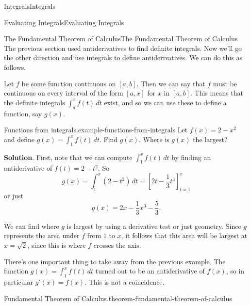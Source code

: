 \documentclass[10pt,]{book}
\numberwithin{equation}{section}
\begin{document}
\begin{chapterptx}{Integrals}{}{Integrals}{}{}
\begin{sectionptx}{Evaluating Integrals}{}{Evaluating Integrals}{}{}
\end{sectionptx}
%
%
\typeout{************************************************}
\typeout{************************************************}
%
\begin{sectionptx}{The Fundamental Theorem of Calculus}{}{The Fundamental Theorem of Calculus}{}{}\label{section-the-fundamental-theorem-of-calculus}
\hypertarget{p-460}{}%
The previous section used antiderivatives to find definite integrals. Now we'll go the other direction and use integrals to define antiderivatives. We can do this as follows.%
\par
\hypertarget{p-461}{}%
Let \(f\) be some function continuous on \([a,b]\). Then we can say that \(f\) must be continuous on every interval of the form \([a,x]\) for \(x\) in \([a,b]\). This means that the definite integrals \(\int_{a}^{x}f(t)\,dt\) exist, and so we can use these to define a function, say \(g(x)\).%
\begin{example}{Functions from integrals.}{example-functions-from-integrals}%
\hypertarget{p-462}{}%
Let \(f(x) = 2 - x^{2}\) and define \(g(x) = \int_{1}^{x}f(t)\,dt\). Find \(g(x)\). Where is \(g(x)\) the largest?%
\par\smallskip%
\noindent\textbf{Solution}.\hypertarget{solution-101}{}\quad%
\hypertarget{p-463}{}%
First, note that we can compute \(\int_{1}^{x}f(t)\,dt\) by finding an antiderivative of \(f(t) = 2 - t^{2}\). So%
\begin{equation*}
g(x) = \int_{1}^{x}(2-t^{2})\,dt = \left[2t-\frac{1}{3}t^{3}\right]_{t=1}^{x}
\end{equation*}
or just%
\begin{equation*}
g(x) = 2x - \frac{1}{3}x^{3} - \frac{5}{3}.
\end{equation*}
%
\par
\hypertarget{p-464}{}%
We can find where \(g\) is largest by using a derivative test or just geometry. Since \(g\) represents the area under \(f\) from \(1\) to \(x\), it follows that this area will be largest at \(x=\sqrt{2}\), since this is where \(f\) crosses the axis.%
\end{example}
\hypertarget{p-465}{}%
There's one important thing to take away from the previous example. The function \(g(x) = \int_{1}^{x}f(t)\,dt\) turned out to be an antiderivative of \(f(x)\), so in particular \(g'(x) = f(x)\). This is not a coincidence.%
\begin{theorem}{Fundamental Theorem of Calculus.}{}{theorem-fundamental-theorem-of-calculus}%

\end{theorem}
\end{sectionptx}
\end{chapterptx}
\end{document}
